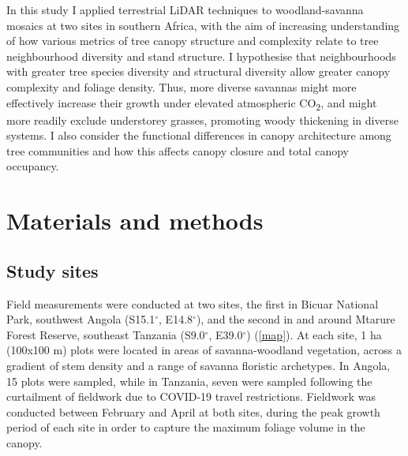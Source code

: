 \documentclass[11pt,a4paper]{article}
\begin{document}
In this study I applied terrestrial LiDAR techniques to woodland-savanna mosaics at two sites in southern Africa, with the aim of increasing understanding of how various metrics of tree canopy structure and complexity relate to tree neighbourhood diversity and stand structure. I hypothesise that neighbourhoods with greater tree species diversity and structural diversity allow greater canopy complexity and foliage density. Thus, more diverse savannas might more effectively increase their growth under elevated atmospheric CO\textsubscript{2}, and might more readily exclude understorey grasses, promoting woody thickening in diverse systems. I also consider the functional differences in canopy architecture among tree communities and how this affects canopy closure and total canopy occupancy.

\section{Materials and methods}

\subsection{Study sites}

Field measurements were conducted at two sites, the first in Bicuar National Park, southwest Angola (S15.1$^\circ$, E14.8$^\circ$), and the second in and around Mtarure Forest Reserve, southeast Tanzania (S9.0$^\circ$, E39.0$^\circ$) (\autoref{map}). At each site, 1 ha (100x100 m) plots were located in areas of savanna-woodland vegetation, across a gradient of stem density and a range of savanna floristic archetypes. In Angola, 15 plots were sampled, while in Tanzania, seven were sampled following the curtailment of fieldwork due to COVID-19 travel restrictions. Fieldwork was conducted between February and April at both sites, during the peak growth period of each site in order to capture the maximum foliage volume in the canopy.
\end{document}
